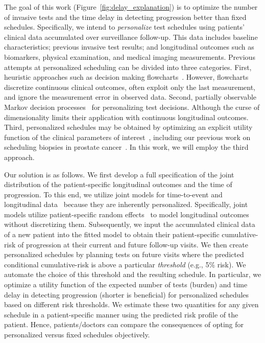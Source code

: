 The goal of this work (Figure~\ref{fig:delay_explanation}) is to optimize the number of invasive tests and the time delay in detecting progression better than fixed schedules. Specifically, we intend to \emph{personalize} test schedules using patients' clinical data accumulated over surveillance follow-up. This data includes baseline characteristics; previous invasive test results; and longitudinal outcomes such as biomarkers, physical examination, and medical imaging measurements. Previous attempts at personalized scheduling can be divided into three categories. First, heuristic approaches such as decision making flowcharts~\citep{bokhorst2015compliance,weusten2017endoscopic}. However, flowcharts discretize continuous clinical outcomes, often exploit only the last measurement, and ignore the measurement error in observed data. Second, partially observable Markov decision processes~\citep{alagoz2010operations, steimle2017markov} for personalizing test decisions. Although the curse of dimensionality limits their application with continuous longitudinal outcomes. Third, personalized schedules may be obtained by optimizing an explicit utility function of the clinical parameters of interest~\citep{bebu2017optimal,rizopoulos2015personalized}, including our previous work on scheduling biopsies in prostate cancer~\citep{tomer2019personalized,tomer2020webapp}. In this work, we will employ the third approach.

Our solution is as follows. We first develop a full specification of the joint distribution of the patient-specific longitudinal outcomes and the time of progression. To this end, we utilize joint models for time-to-event and longitudinal data~\citep{tsiatis2004joint,rizopoulos2012joint} because they are inherently personalized. Specifically, joint models utilize patient-specific random effects~\citep{mcculloch2005generalized} to model longitudinal outcomes without discretizing them. Subsequently, we input the accumulated clinical data of a new patient into the fitted model to obtain their patient-specific cumulative-risk of progression at their current and future follow-up visits. We then create personalized schedules by planning tests on future visits where the predicted conditional cumulative-risk is above a particular \emph{threshold} (e.g., 5\% risk). We automate the choice of this threshold and the resulting schedule. In particular, we optimize a utility function of the expected number of tests (burden) and time delay in detecting progression (shorter is beneficial) for personalized schedules based on different risk thresholds. We estimate these two quantities for any given schedule in a patient-specific manner using the predicted risk profile of the patient. Hence, patients/doctors can compare the consequences of opting for personalized versus fixed schedules objectively.

